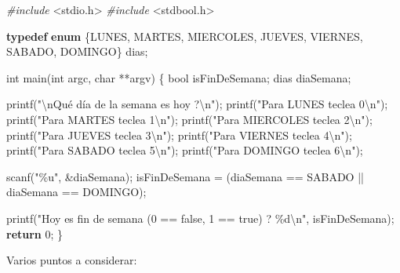 \documentclass[
]{book}
\newenvironment{Shaded}{\begin{snugshade}}{\end{snugshade}}
\newcommand{\ControlFlowTok}[1]{\textcolor[rgb]{0.13,0.29,0.53}{\textbf{#1}}}
\newcommand{\DataTypeTok}[1]{\textcolor[rgb]{0.13,0.29,0.53}{#1}}
\newcommand{\DecValTok}[1]{\textcolor[rgb]{0.00,0.00,0.81}{#1}}
\newcommand{\ImportTok}[1]{#1}
\newcommand{\KeywordTok}[1]{\textcolor[rgb]{0.13,0.29,0.53}{\textbf{#1}}}
\newcommand{\NormalTok}[1]{#1}
\newcommand{\PreprocessorTok}[1]{\textcolor[rgb]{0.56,0.35,0.01}{\textit{#1}}}
\newcommand{\SpecialCharTok}[1]{\textcolor[rgb]{0.00,0.00,0.00}{#1}}
\newcommand{\StringTok}[1]{\textcolor[rgb]{0.31,0.60,0.02}{#1}}
\begin{document}
\begin{Shaded}
\begin{Highlighting}[]
\PreprocessorTok{\#include }\ImportTok{\textless{}stdio.h\textgreater{}}
\PreprocessorTok{\#include }\ImportTok{\textless{}stdbool.h\textgreater{}}

\KeywordTok{typedef} \KeywordTok{enum}\NormalTok{ \{LUNES, MARTES, MIERCOLES, JUEVES, VIERNES, SABADO, DOMINGO\} dias;}

\DataTypeTok{int}\NormalTok{ main(}\DataTypeTok{int}\NormalTok{ argc, }\DataTypeTok{char}\NormalTok{ **argv) \{}
    \DataTypeTok{bool}\NormalTok{ isFinDeSemana;}
\NormalTok{    dias diaSemana;}

\NormalTok{    printf(}\StringTok{"}\SpecialCharTok{\textbackslash{}n}\StringTok{Qué día de la semana es hoy ?}\SpecialCharTok{\textbackslash{}n}\StringTok{"}\NormalTok{);}
\NormalTok{    printf(}\StringTok{"Para LUNES teclea 0}\SpecialCharTok{\textbackslash{}n}\StringTok{"}\NormalTok{);}
\NormalTok{    printf(}\StringTok{"Para MARTES teclea 1}\SpecialCharTok{\textbackslash{}n}\StringTok{"}\NormalTok{);}
\NormalTok{    printf(}\StringTok{"Para MIERCOLES teclea 2}\SpecialCharTok{\textbackslash{}n}\StringTok{"}\NormalTok{);}
\NormalTok{    printf(}\StringTok{"Para JUEVES teclea 3}\SpecialCharTok{\textbackslash{}n}\StringTok{"}\NormalTok{);}
\NormalTok{    printf(}\StringTok{"Para VIERNES teclea 4}\SpecialCharTok{\textbackslash{}n}\StringTok{"}\NormalTok{);}
\NormalTok{    printf(}\StringTok{"Para SABADO teclea 5}\SpecialCharTok{\textbackslash{}n}\StringTok{"}\NormalTok{);}
\NormalTok{    printf(}\StringTok{"Para DOMINGO teclea 6}\SpecialCharTok{\textbackslash{}n}\StringTok{"}\NormalTok{);}

\NormalTok{    scanf(}\StringTok{"\%u"}\NormalTok{, \&diaSemana);}
\NormalTok{    isFinDeSemana = (diaSemana == SABADO || diaSemana == DOMINGO);}

\NormalTok{    printf(}\StringTok{"Hoy es fin de semana (0 == false, 1 == true) ? \%d}\SpecialCharTok{\textbackslash{}n}\StringTok{"}\NormalTok{, isFinDeSemana);}
    \ControlFlowTok{return} \DecValTok{0}\NormalTok{;}
\NormalTok{\}}
\end{Highlighting}
\end{Shaded}

Varios puntos a considerar:
\end{document}
